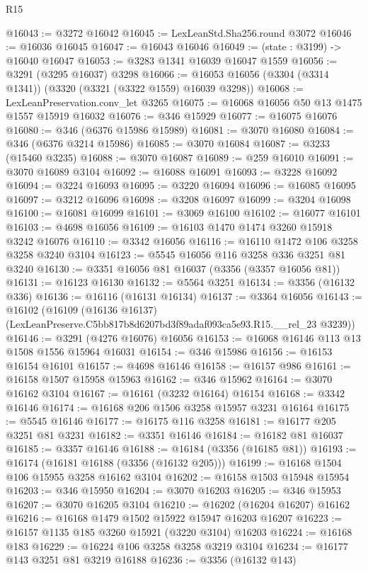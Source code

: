 \begin{lexlean}{R15}
\begin{coremodule}
@16043 := @3272 @16042
@16045 := LexLeanStd.Sha256.round @3072
@16046 := @16036 @16045
@16047 := @16043 @16046
@16049 := (state : @3199) -> @16040 @16047
@16053 := @3283 @1341 @16039 @16047 @1559
@16056 := @3291 (@3295 @16037) @3298
@16066 := @16053 @16056 (@3304 (@3314 @1341)) (@3320 (@3321 (@3322 @1559) @16039 @3298))
@16068 := LexLeanPreservation.conv_let @3265
@16075 := @16068 @16056 @50 @13 @1475 @1557 @15919 @16032
@16076 := @346 @15929
@16077 := @16075 @16076
@16080 := @346 (@6376 @15986 @15989)
@16081 := @3070 @16080
@16084 := @346 (@6376 @3214 @15986)
@16085 := @3070 @16084
@16087 := @3233 (@15460 @3235)
@16088 := @3070 @16087
@16089 := @259 @16010
@16091 := @3070 @16089 @3104
@16092 := @16088 @16091
@16093 := @3228 @16092
@16094 := @3224 @16093
@16095 := @3220 @16094
@16096 := @16085 @16095
@16097 := @3212 @16096
@16098 := @3208 @16097
@16099 := @3204 @16098
@16100 := @16081 @16099
@16101 := @3069 @16100
@16102 := @16077 @16101
@16103 := @4698 @16056
@16109 := @16103 @1470 @1474 @3260 @15918 @3242 @16076
@16110 := @3342 @16056
@16116 := @16110 @1472 @106 @3258 @3258 @3240 @3104
@16123 := @5545 @16056 @116 @3258 @336 @3251 @81 @3240
@16130 := @3351 @16056 @81 @16037 (@3356 (@3357 @16056 @81))
@16131 := @16123 @16130
@16132 := @5564 @3251
@16134 := @3356 (@16132 @336)
@16136 := @16116 (@16131 @16134)
@16137 := @3364 @16056
@16143 := @16102
    (@16109 (@16136 @16137) (LexLeanPreserve.C5bb817b8d6207bd3f89adaf093ca5e93.R15.__rel_23 @3239))
@16146 := @3291 (@4276 @16076) @16056
@16153 := @16068 @16146 @113 @13 @1508 @1556 @15964 @16031
@16154 := @346 @15986
@16156 := @16153 @16154 @16101
@16157 := @4698 @16146
@16158 := @16157 @986
@16161 := @16158 @1507 @15958 @15963
@16162 := @346 @15962
@16164 := @3070 @16162 @3104
@16167 := @16161 (@3232 @16164) @16154
@16168 := @3342 @16146
@16174 := @16168 @206 @1506 @3258 @15957 @3231 @16164
@16175 := @5545 @16146
@16177 := @16175 @116 @3258
@16181 := @16177 @205 @3251 @81 @3231
@16182 := @3351 @16146
@16184 := @16182 @81 @16037
@16185 := @3357 @16146
@16188 := @16184 (@3356 (@16185 @81))
@16193 := @16174 (@16181 @16188 (@3356 (@16132 @205)))
@16199 := @16168 @1504 @106 @15955 @3258 @16162 @3104
@16202 := @16158 @1503 @15948 @15954
@16203 := @346 @15950
@16204 := @3070 @16203
@16205 := @346 @15953
@16207 := @3070 @16205 @3104
@16210 := @16202 (@16204 @16207) @16162
@16216 := @16168 @1479 @1502 @15922 @15947 @16203 @16207
@16223 := @16157 @1135 @185 @3260 @15921 (@3220 @3104) @16203
@16224 := @16168 @183
@16229 := @16224 @106 @3258 @3258 @3219 @3104
@16234 := @16177 @143 @3251 @81 @3219 @16188
@16236 := @3356 (@16132 @143)

\end{coremodule}
\end{lexlean}
